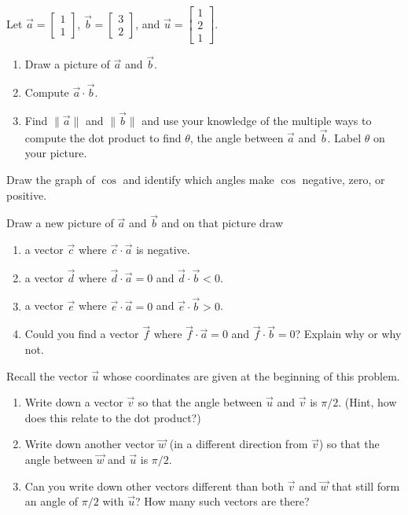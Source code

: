 \documentclass[14pt]{problemset}
\begin{document}
	\question
		Let $\vec a=\begin{bmatrix}1\\1\end{bmatrix}$, $\vec b=\begin{bmatrix}3\\2\end{bmatrix}$, and $\vec u=\begin{bmatrix}1\\2\\1\end{bmatrix}$.
	\begin{parts}
		\item 
		\begin{enumerate}	
			\item Draw a picture of $\vec a $ and $\vec b$.
			\item Compute $\vec a\cdot \vec b$.
			\item Find $\|\vec a\|$ and $\|\vec b\|$ and use your knowledge of
			the multiple ways to compute the dot product to find $\theta$,
			the angle between $\vec a$ and $\vec b$. Label $\theta$ on your picture.
		\end{enumerate}
		\item Draw the graph of $\cos$ and identify which angles make $\cos$ negative, zero,
		or positive.

		\item Draw a new picture of $\vec a$ and $\vec b$ and on that picture draw
		\begin{enumerate}	
			\item a vector $\vec c$ where $\vec c\cdot \vec a$ is negative.
			\item a vector $\vec d$ where $\vec d\cdot \vec a=0$ and $\vec d\cdot \vec b < 0$.
			\item a vector $\vec e$ where $\vec e\cdot \vec a=0$ and $\vec e\cdot \vec b>0$.
			\item Could you find a vector $\vec f$ where $\vec f\cdot \vec a=0$ and $\vec f\cdot \vec b=0$?
			Explain why or why not.
		\end{enumerate}

		\item Recall the vector $\vec u$ whose coordinates are given at the beginning of this problem.
		\begin{enumerate}
			\item Write down a vector $\vec v$ so that the angle between $\vec u$ and $\vec v$
			is $\pi/2$. (Hint, how does this relate to the dot product?)
			\item Write down another vector $\vec w$ (in a different direction from $\vec v$)
			so that the angle between $\vec w$ and $\vec u$ is $\pi/2$.
			\item Can you write down other vectors different than both $\vec v$ and $\vec w$ that still
			form an angle of $\pi/2$ with $\vec u$?  How many such vectors are there?
		\end{enumerate}
	\end{parts}
\end{document}
